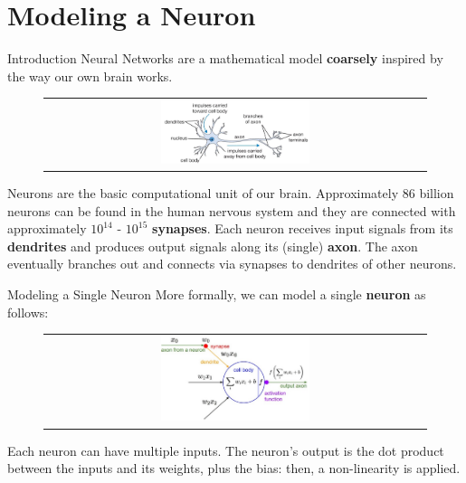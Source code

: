 \documentclass[aspectratio=169]{beamer}
\begin{document}
\section{Modeling a Neuron}

\begin{frame}{Introduction}
Neural Networks are a mathematical model \textbf{coarsely} inspired by the way our own brain works.
\begin{figure}
\begin{tabular}{c}
\includegraphics[width=0.4\textwidth]{img/dnn/biological_neuron.jpg}
\end{tabular}
\end{figure}
\small{Neurons are the basic computational unit of our brain. Approximately 86 billion neurons can be found in the human nervous system and they are connected with approximately $10^{14}$ - $10^{15}$ \textbf{synapses}. Each neuron receives input signals from its \textbf{dendrites} and produces output signals along its (single) \textbf{axon}. The axon eventually branches out and connects via synapses to dendrites of other neurons.}
\end{frame}


\begin{frame}{Modeling a Single Neuron}
More formally, we can model a single \textbf{neuron} as follows:
\begin{figure}
\begin{tabular}{c}
\includegraphics[width=0.4\textwidth]{img/dnn/single_neuron.jpg}
\end{tabular}
\end{figure}
Each neuron can have multiple inputs. The neuron's output is the dot product between the inputs and its weights, plus the bias: then, a non-linearity is applied.
\end{frame}
\end{document}
